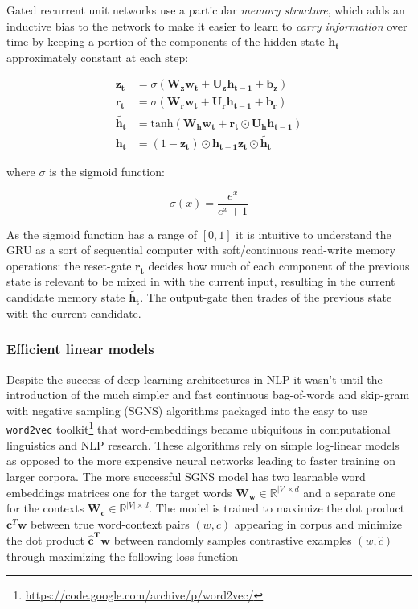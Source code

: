 Gated recurrent unit networks use a particular \emph{memory structure}, which
adds an inductive bias to the network to make it easier to learn to \emph{carry information}
over time by keeping a portion of the components of the hidden state $\mathbf{h_t}$
approximately constant at each step:

\begin{align}
\tag{update-gate}
\mathbf{z_t} &= \sigma(\mathbf{W_z} \mathbf{w_t} + \mathbf{U_z} \mathbf{h_{t-1}} + \mathbf{b_z}) \\
\tag{reset-gate}
\mathbf{r_t} &= \sigma(\mathbf{W_r} \mathbf{w_t} + \mathbf{U_r} \mathbf{h_{t-1}} + \mathbf{b_r})  \\
\tag{memory content}
\mathbf{\tilde{h_t}} &= \text{tanh}(\mathbf{W_h} \mathbf{w_t} + \mathbf{r_t} \odot  \mathbf{U_h} \mathbf{h_{t-1}}) \\
\tag{hidden state}
\mathbf{h_t} &= (1-\mathbf{z_t}) \odot \mathbf{h_{t-1}}  \mathbf{z_t} \odot \mathbf{\tilde{h_t}}
\end{align}

where $\sigma$ is the sigmoid function:

\begin{equation}
\sigma(x) = \frac{e^x}{e^x + 1}
\end{equation}

As the sigmoid function has a range of $[0,1]$ it is intuitive to understand the GRU as a sort of
sequential computer with soft/continuous read-write memory operations: the reset-gate $\mathbf{r_t}$
decides how much of each component of the previous state is relevant to be mixed in with the
current input, resulting in the current candidate memory state $\mathbf{\tilde{h_t}}$. The output-gate
then trades of the previous state with the current candidate.



\subsubsection{Efficient linear models}
\label{sec:w2v}
Despite the success of deep learning architectures in NLP it wasn't until the introduction
of the much simpler and fast continuous bag-of-words
and skip-gram with negative sampling (SGNS) algorithms \cite{mikolov2013efficient}
packaged into the easy to use \texttt{word2vec}
toolkit\footnote{\url{https://code.google.com/archive/p/word2vec/}} that
word-embeddings became ubiquitous in computational linguistics and NLP research.
These algorithms rely on simple log-linear models as opposed to the more expensive
neural networks leading to faster training on larger corpora. The more successful SGNS
model has two learnable word embeddings matrices one for the target words
$\mathbf{W_w}  \in \mathbb{R}^{|V| \times d}$
and a separate one for the contexts $\mathbf{W_c} \in \mathbb{R}^{|V| \times d}$.
The model is trained to maximize the dot product $\mathbf{c}^T\mathbf{w}$
between true word-context pairs $(w,c)$ appearing in corpus and minimize the
dot product $\mathbf{\hat{c}^T\mathbf{w}}$ between randomly
samples contrastive examples $(w,\hat{c})$ through  maximizing the following loss function

